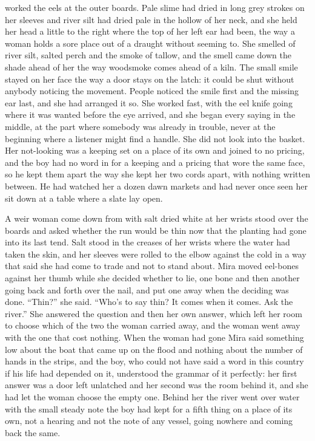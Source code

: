  worked the eels at the outer boards. Pale slime had dried in long grey strokes on her sleeves and river silt had dried pale in the hollow of her neck, and she held her head a little to the right where the top of her left ear had been, the way a woman holds a sore place out of a draught without seeming to. She smelled of river silt, salted perch and the smoke of tallow, and the smell came down the shade ahead of her the way woodsmoke comes ahead of a kiln. The small smile stayed on her face the way a door stays on the latch: it could be shut without anybody noticing the movement. People noticed the smile first and the missing ear last, and she had arranged it so. She worked fast, with the eel knife going where it was wanted before the eye arrived, and she began every saying in the middle, at the part where somebody was already in trouble, never at the beginning where a listener might find a handle. She did not look into the basket. Her not-looking was a keeping set on a place of its own and joined to no pricing, and the boy had no word in  for a keeping and a pricing that wore the same face, so he kept them apart the way she kept her two cords apart, with nothing written between. He had watched her a dozen dawn markets and had never once seen her sit down at a table where a slate lay open.

A weir woman come down from  with salt dried white at her wrists stood over the boards and asked whether the run would be thin now that the planting had gone into its last tend. Salt stood in the creases of her wrists where the water had taken the skin, and her sleeves were rolled to the elbow against the cold in a way that said she had come to trade and not to stand about. Mira moved eel-bones against her thumb while she decided whether to lie, one bone and then another going back and forth over the nail, and put one away when the deciding was done. “Thin?” she said. “Who's to say thin? It comes when it comes. Ask the river.” She answered the question and then her own answer, which left her room to choose which of the two the woman carried away, and the woman went away with the one that cost nothing. When the woman had gone Mira said something low about the boat that came up on the flood and nothing about the number of hands in the strips, and the boy, who could not have said a word in this country if his life had depended on it, understood the grammar of it perfectly: her first answer was a door left unlatched and her second was the room behind it, and she had let the woman choose the empty one. Behind her the river went over water with the small steady note the boy had kept for a fifth thing on a place of its own, not a hearing and not the note of any vessel, going nowhere and coming back the same.

